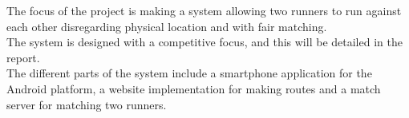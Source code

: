 The focus of the project is making a system allowing two runners to run against each other disregarding physical location and with fair matching. \\
The system is designed with a competitive focus, and this will be detailed in the report. \\
The different parts of the system include a smartphone application for the Android platform, a website implementation for making routes and a match server for matching two runners.